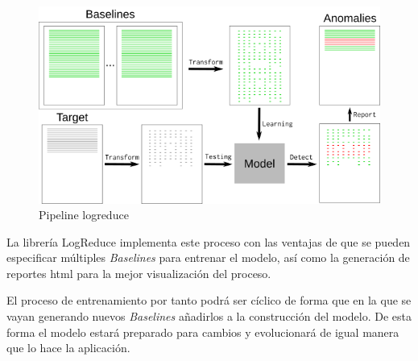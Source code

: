 \begin{figure}[H]
\centerline{\includegraphics[width=15cm]{figuras/logreduce.png}}
\caption{Pipeline logreduce}
\label{enlace1}
\end{figure}

La librería LogReduce implementa este proceso con las ventajas de que se pueden especificar múltiples \textit{Baselines} para entrenar el modelo, así como la generación de reportes html para la mejor visualización del proceso.

El proceso de entrenamiento por tanto podrá ser cíclico de forma que en la que se vayan generando nuevos \textit{Baselines} añadirlos a la construcción del modelo. De esta forma el modelo estará preparado para cambios y evolucionará de igual manera que lo hace la aplicación. 

